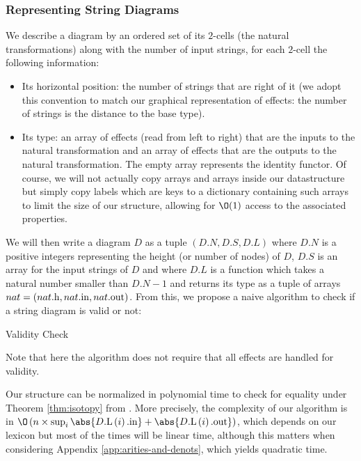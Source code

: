 \subsubsection{Representing String Diagrams}
We describe a diagram by an ordered set of its $2$-cells (the natural
transformations) along with the number of input strings, for each $2$-cell
the following information:
\begin{itemize}
	\item Its horizontal position: the number of strings that are right of it (we
	      adopt this convention to match our graphical representation of effects:
	      the number of strings is the distance to the base type).
	\item Its type: an array of effects (read from left to right) that are the
	      inputs to the natural transformation and an array of effects that are
	      the outputs to the natural transformation.
	      The empty array represents the identity functor.
	      Of course, we will not actually copy arrays and arrays inside our
	      datastructure but simply copy labels which are keys to a dictionary
	      containing such arrays to limit the size of our structure, allowing for
	      $\O(1)$ access to the associated properties.
\end{itemize}
We will then write a diagram $D$ as a tuple $\left( D.N, D.S, D.L \right)$
where $D.N$ is a positive integers representing the height (or number of nodes)
of $D$, $D.S$ is an array for the input strings of $D$ and where $D.L$ is a
function which takes a natural number smaller than $D.N - 1$ and returns its
type as a tuple of arrays
$nat = \left( nat\mathrm{.h}, nat\mathrm{.in}, nat\mathrm{.out} \right)$.
From this, we propose a naive algorithm to check if a string diagram is valid
or not:
\begin{algorithm}[h]
	\caption{Validity Check}
	\begin{algorithmic}
		\EndIf
		\EndFor
		\EndFunction
	\end{algorithmic}
\end{algorithm}
Note that here the algorithm does not require that all effects are handled for
validity.

\medskip

Our structure can be normalized in polynomial time to check for equality under
Theorem \ref{thm:isotopy} from \cite{delpeuchNormalizationPlanarString2022}.
More precisely, the complexity of our algorithm is in $\O\left( n \times
	\sup_{i} \abs{\dnin{\dlb{D}{i}}} + \abs{\dnout{\dlb{D}{i}}} \right)$,
which depends on our lexicon but most of the times will be linear time,
although this matters when considering Appendix \ref{app:arities-and-denots},
which yields quadratic time.

